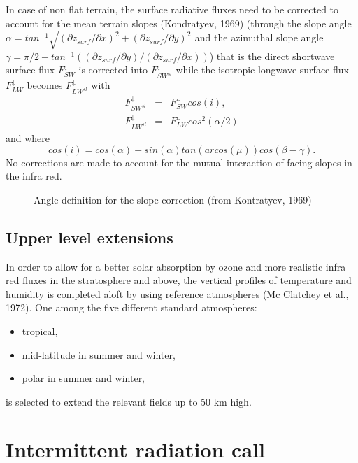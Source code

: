 In case of non flat terrain, the surface radiative fluxes need to be corrected
to account for the mean terrain slopes (Kondratyev, 1969) (through the slope
angle $\alpha=tan^{-1}
\sqrt{(\partial{z_{surf}}/\partial{x})^2+(\partial{z_{surf}}/\partial{y})^2}$
and the azimuthal slope angle $\gamma=\pi/2-
tan^{-1}((\partial{z_{surf}}/\partial{y})/(\partial{z_{surf}}/\partial{x}))$)
that is the direct shortwave surface flux $F^{\!\downarrow}_{SW}$ is corrected
into $F^{\!\downarrow}_{{SW}^{sl}}$ while the isotropic longwave surface flux
$F^{\!\downarrow}_{LW}$ becomes $F^{\!\downarrow}_{{LW}^{sl}}$ with
\begin{eqnarray}
F^{\!\downarrow}_{{SW}^{sl}} &=& F^{\!\downarrow}_{SW} cos(i), \\
F^{\!\downarrow}_{{LW}^{sl}} &=& F^{\!\downarrow}_{LW} cos^2(\alpha/2)
\end{eqnarray}
and where
$$cos(i) = cos(\alpha)+sin(\alpha)tan(arcos(\mu))cos(\beta-\gamma).$$
No corrections are made to account for the mutual interaction of facing slopes
in the infra red.

\begin{figure}[hpbt]
\caption{Angle definition for the slope correction (from Kontratyev, 1969)}
\end{figure}

%
\subsection{Upper level extensions}
%

In order to allow for a better solar absorption by ozone and more realistic
infra red fluxes in the stratosphere and above, the vertical profiles of
temperature and humidity is completed aloft by using reference atmospheres
(Mc Clatchey et al., 1972). One among the five different standard atmospheres:

\begin{itemize}
\item tropical,
\item mid-latitude in summer and winter,
\item polar in summer and winter,
\end{itemize}

\noindent is selected to extend the relevant fields up to 50 km high.\\

%
\section{Intermittent radiation call}
\label{section5}
%

